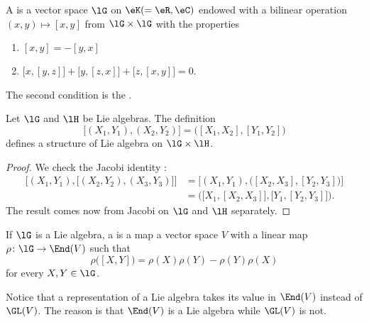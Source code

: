 
\begin{definition}      \label{DEFooVBPKooGxlDBn}
	A  is a vector space \( \lG\) on \( \eK(=\eR,\eC)\) endowed with a bilinear operation \( (x,y)\mapsto [x,y]\) from \( \lG\times\lG\) with the properties
	\begin{enumerate}
		\item
		      \( [x,y]=-[y,x]\)
		\item
		      \( \big[ x,[y,z] \big]+\big[ y,[z,x] \big]+\big[ z,[x,y] \big]=0\).
	\end{enumerate}
	The second condition is the .
\end{definition}

\begin{definition}	\label{DEFooNBHXooMZdXGt}
	Let \( \lG\) and \( \lH\) be Lie algebras. The definition
	\begin{equation}
		\big[   (X_1,Y_1),(X_2,Y_2) \big]=\big( [X_1,X_2],[Y_1,Y_2] \big)
	\end{equation}
	defines a structure of Lie algebra on \( \lG\times \lH\).
\end{definition}

\begin{proof}
	We check the Jacobi identity :
	\begin{subequations}
		\begin{align}
			\Big[   (X_1,Y_1),\big[ (X_2,Y_2),(X_3,Y_3)    \big]   \Big] & =\Big[   (X_1,Y_1),\big(  [X_2,X_3],[Y_2,Y_3]   \big)   \Big]         \\
			                                                             & =\Big( \big[  X_1,[X_2,X_3]  \big],\big[  Y_1,[Y_2,Y_3]  \big] \Big).
		\end{align}
	\end{subequations}
	The result comes now from Jacobi on \( \lG\) and \( \lH\) separately.
\end{proof}

\begin{definition}     \label{DEFooHINCooYoxPFj}
	If \( \lG\) is a Lie algebra, a  is a map a vector space \( V\) with a linear map \( \rho\colon \lG\to \End(V)\) such that
	\begin{equation}
		\rho\big( [X,Y] \big)=\rho(X)\rho(Y)-\rho(Y)\rho(X)
	\end{equation}
	for every \( X,Y\in \lG\).

	Notice that a representation of a Lie algebra takes its value in \( \End(V)\) instead of \( \GL(V)\). The reason is that \( \End(V)\) is a Lie algebra while \( \GL(V)\) is not.
\end{definition}

